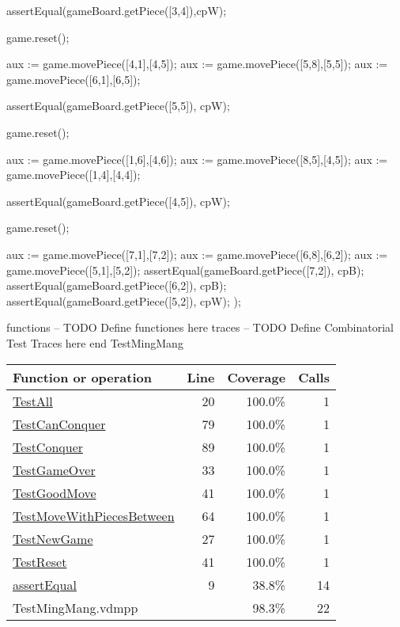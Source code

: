 \begin{vdmpp}[breaklines=true]
  assertEqual(gameBoard.getPiece([3,4]),cpW);
  
  game.reset();
  
  aux := game.movePiece([4,1],[4,5]);
  aux := game.movePiece([5,8],[5,5]);
  aux := game.movePiece([6,1],[6,5]);
  
  assertEqual(gameBoard.getPiece([5,5]), cpW);
  
  game.reset();
  
  aux := game.movePiece([1,6],[4,6]);
  aux := game.movePiece([8,5],[4,5]);
  aux := game.movePiece([1,4],[4,4]);
    
  assertEqual(gameBoard.getPiece([4,5]), cpW);
  
  game.reset();
  
  aux := game.movePiece([7,1],[7,2]);
  aux := game.movePiece([6,8],[6,2]);
  aux := game.movePiece([5,1],[5,2]);  
  assertEqual(gameBoard.getPiece([7,2]), cpB); 
  assertEqual(gameBoard.getPiece([6,2]), cpB); 
  assertEqual(gameBoard.getPiece([5,2]), cpW);  
 );
 
functions
-- TODO Define functiones here
traces
-- TODO Define Combinatorial Test Traces here
end TestMingMang
\end{vdmpp}
\bigskip
\begin{longtable}{|l|r|r|r|}
\hline
Function or operation & Line & Coverage & Calls \\
\hline
\hline
\hyperref[TestAll:20]{TestAll} & 20&100.0\% & 1 \\
\hline
\hyperref[TestCanConquer:79]{TestCanConquer} & 79&100.0\% & 1 \\
\hline
\hyperref[TestConquer:89]{TestConquer} & 89&100.0\% & 1 \\
\hline
\hyperref[TestGameOver:33]{TestGameOver} & 33&100.0\% & 1 \\
\hline
\hyperref[TestGoodMove:41]{TestGoodMove} & 41&100.0\% & 1 \\
\hline
\hyperref[TestMoveWithPiecesBetween:64]{TestMoveWithPiecesBetween} & 64&100.0\% & 1 \\
\hline
\hyperref[TestNewGame:27]{TestNewGame} & 27&100.0\% & 1 \\
\hline
\hyperref[TestReset:41]{TestReset} & 41&100.0\% & 1 \\
\hline
\hyperref[assertEqual:9]{assertEqual} & 9&38.8\% & 14 \\
\hline
\hline
TestMingMang.vdmpp & & 98.3\% & 22 \\
\hline
\end{longtable}

